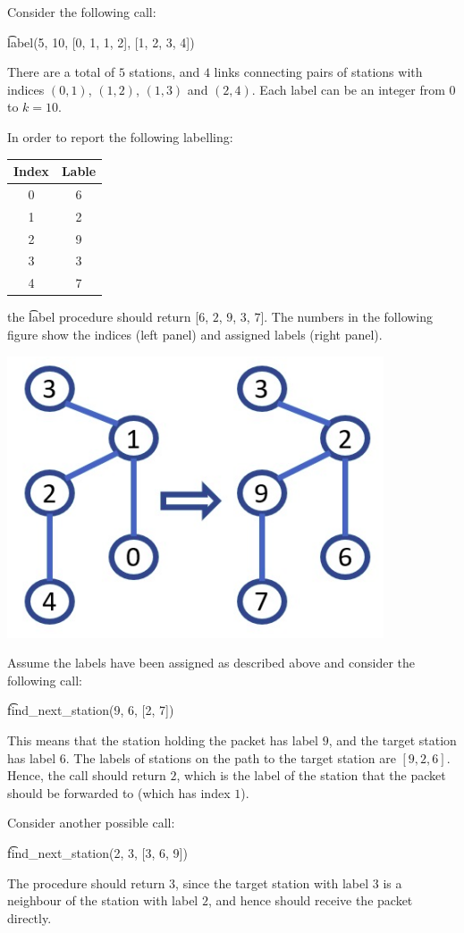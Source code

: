 Consider the following call:

\t{label(5, 10, [0, 1, 1, 2], [1, 2, 3, 4])}

There are a total of $5$ stations, and $4$ links connecting pairs of stations with indices $(0, 1)$, $(1, 2)$, $(1, 3)$ and $(2, 4)$. Each label can be an integer from $0$ to $k=10$.

In order to report the following labelling:

\begin{center}
\renewcommand{\arraystretch}{1.5}
\begin{tabular}{|c|c|}
\hline
Index & Lable  \\
\hline
0 & 6 \\
\hline
1 & 2 \\
\hline
2 & 9 \\
\hline
3 & 3\\
\hline
4 & 7\\
\hline

\end{tabular}
\end{center}

the \t{label} procedure should return [$6$, $2$, $9$, $3$, $7$]. The numbers in the following figure show the indices (left panel) and assigned labels (right panel).

\includegraphics{1.png}

Assume the labels have been assigned as described above and consider the following call:

\t{find\_next\_station(9, 6, [2, 7])}

This means that the station holding the packet has label $9$, and the target station has label $6$. The labels of stations on the path to the target station are $[9, 2, 6]$. Hence, the call should return $2$, which is the label of the station that the packet should be forwarded to (which has index $1$).

Consider another possible call:

\t{find\_next\_station(2, 3, [3, 6, 9])}

The procedure should return $3$, since the target station with label $3$ is a neighbour of the station with
label $2$, and hence should receive the packet directly.
